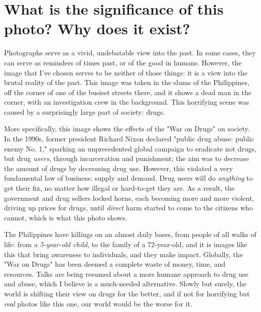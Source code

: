 \documentclass[../../main.tex]{subfiles}
\begin{document}
\section{What is the significance of this photo? Why does it exist?}
Photographs serve as a vivid, undebatable view into the past. In some cases, they can serve as reminders of times past, or of the good in humans. However, the image that I've chosen serves to be neither of those things: it is a view into the brutal reality of the past. This image was taken in the slums of the Philippines, off the corner of one of the busiest streets there, and it shows a dead man in the corner, with an investigation crew in the background. This horrifying scene was caused by a surprisingly large part of society: drugs. 

More specifically, this image shows the effects of the "War on Drugs" on society. In the 1990s, former president Richard Nixon declared "public drug abuse: public enemy No. 1," sparking an unprecedented global campaign to eradicate not drugs, but drug \textit{users}, through incarceration and punishment; the aim was to decrease the amount of drugs by decreasing drug use. However, this violated a very fundamental law of business: supply and demand. Drug users will do  \textit{anything} to get their fix, no matter how illegal or hard-to-get they are. As a result, the government and drug sellers locked horns, each becoming more and more violent, driving up prices for drugs, until \textit{direct} harm started to come to the citizens who cannot, which is what this photo shows.

The Philippines have killings on an almost daily bases, from people of all walks of life: from a \textit{5-year-old child}, to the family of a 72-year-old, and it is images like this that bring awareness to individuals, and they make impact. Globally, the "War on Drugs" has been deemed a complete waste of money, time, and resources. Talks are being resumed about a more humane approach to drug use and abuse, which I believe is a much-needed alternative. Slowly but surely, the world is shifting their view on drugs for the better, and if not for horrifying but \textit{real} photos like this one, our world would be the worse for it.
\end{document}
